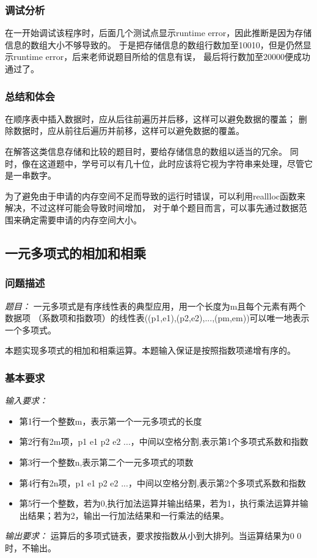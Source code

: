 \documentclass[a4paper,11pt]{article}%
\newenvironment{shadedquotation}
 {\begin{shaded*}
  \quoting[leftmargin=0pt, vskip=0pt]
 }
 {\endquoting
 \end{shaded*}
}
\begin{document}
\subsubsection{调试分析}
在一开始调试该程序时，后面几个测试点显示runtime error，因此推断是因为存储信息的数组大小不够导致的。
于是把存储信息的数组行数加至10010，但是仍然显示runtime error，后来老师说题目所给的信息有误，
最后将行数加至20000便成功通过了。
\subsubsection{总结和体会}
在顺序表中插入数据时，应从后往前遍历并后移，这样可以避免数据的覆盖；
删除数据时，应从前往后遍历并前移，这样可以避免数据的覆盖。

在解答这类信息存储和比较的题目时，要给存储信息的数组以适当的冗余。
同时，像在这道题中，学号可以有几十位，此时应该将它视为字符串来处理，尽管它是一串数字。

为了避免由于申请的内存空间不足而导致的运行时错误，可以利用reallloc函数来解决，不过这样可能会导致时间增加，
对于单个题目而言，可以事先通过数据范围来确定需要申请的内存空间大小。
\subsection{一元多项式的相加和相乘}
\subsubsection{问题描述}
\begin{shadedquotation}
    \emph{题目：}
    一元多项式是有序线性表的典型应用，用一个长度为m且每个元素有两个数据项
    （系数项和指数项）的线性表((p1,e1),(p2,e2),...,(pm,em))可以唯一地表示一个多项式。 
    
    本题实现多项式的相加和相乘运算。本题输入保证是按照指数项递增有序的。
\end{shadedquotation}
\subsubsection{基本要求}
\begin{shadedquotation}
    \emph{输入要求：}
    \begin{itemize}
        \item 第1行一个整数m，表示第一个一元多项式的长度
        \item 第2行有2m项，p1 e1 p2 e2 ...，中间以空格分割,表示第1个多项式系数和指数
        \item 第3行一个整数n,表示第二个一元多项式的项数
        \item 第4行有2n项，p1 e1 p2 e2 ...，中间以空格分割,表示第2个多项式系数和指数
        \item 第5行一个整数，若为0,执行加法运算并输出结果，若为1，执行乘法运算并输出结果；若为2，输出一行加法结果和一行乘法的结果。
    \end{itemize}
\end{shadedquotation}
\begin{shadedquotation}
    \emph{输出要求：}
    运算后的多项式链表，要求按指数从小到大排列。当运算结果为0 0时，不输出。
\end{shadedquotation}    
\end{document}
